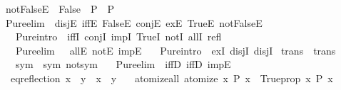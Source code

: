 \begin{isabellebody}
%
\endisatagproof
{\isafoldproof}%
%
\isadelimproof
%
\endisadelimproof
\isanewline
{}\isamarkupfalse%
\ notFalseE{\isacharcolon}{\kern0pt}\ {\isachardoublequoteopen}{\isasymnot}\ False\ {\isasymLongrightarrow}\ P\ {\isasymLongrightarrow}\ P{\isachardoublequoteclose}%
\isadelimproof
\ %
\endisadelimproof
%
\isatagproof
\isacommand{{\isachardot}{\kern0pt}}\isamarkupfalse%
%
\endisatagproof
{\isafoldproof}%
%
\isadelimproof
%
\endisadelimproof
\isanewline
\isanewline
{}\isamarkupfalse%
\ {\isacharbrackleft}{\kern0pt}Pure{\isachardot}{\kern0pt}elim{\isacharbang}{\kern0pt}{\isacharbrackright}{\kern0pt}\ {\isacharequal}{\kern0pt}\ disjE\ iffE\ FalseE\ conjE\ exE\ TrueE\ notFalseE\isanewline
\ \ \ {\isacharbrackleft}{\kern0pt}Pure{\isachardot}{\kern0pt}intro{\isacharbang}{\kern0pt}{\isacharbrackright}{\kern0pt}\ {\isacharequal}{\kern0pt}\ iffI\ conjI\ impI\ TrueI\ notI\ allI\ refl\isanewline
\ \ \ {\isacharbrackleft}{\kern0pt}Pure{\isachardot}{\kern0pt}elim\ {}{\isacharbrackright}{\kern0pt}\ {\isacharequal}{\kern0pt}\ allE\ notE{\isacharprime}{\kern0pt}\ impE{\isacharprime}{\kern0pt}\isanewline
\ \ \ {\isacharbrackleft}{\kern0pt}Pure{\isachardot}{\kern0pt}intro{\isacharbrackright}{\kern0pt}\ {\isacharequal}{\kern0pt}\ exI\ disjI{}\ disjI{}\isanewline
\isanewline
{}\isamarkupfalse%
\ {\isacharbrackleft}{\kern0pt}trans{\isacharbrackright}{\kern0pt}\ {\isacharequal}{\kern0pt}\ trans\isanewline
\ \ \ {\isacharbrackleft}{\kern0pt}sym{\isacharbrackright}{\kern0pt}\ {\isacharequal}{\kern0pt}\ sym\ not{\isacharunderscore}{\kern0pt}sym\isanewline
\ \ \ {\isacharbrackleft}{\kern0pt}Pure{\isachardot}{\kern0pt}elim{\isacharquery}{\kern0pt}{\isacharbrackright}{\kern0pt}\ {\isacharequal}{\kern0pt}\ iffD{}\ iffD{}\ impE%
\isadelimdocument
%
\endisadelimdocument
%
\isatagdocument
%
\isamarkuptrue%
%
\endisatagdocument
{\isafolddocument}%
%
\isadelimdocument
%
\endisadelimdocument
{}\isamarkupfalse%
\ \isanewline
\ \ eq{\isacharunderscore}{\kern0pt}reflection{\isacharcolon}{\kern0pt}\ {\isachardoublequoteopen}x\ {\isacharequal}{\kern0pt}\ y\ {\isasymLongrightarrow}\ x\ {\isasymequiv}\ y{\isachardoublequoteclose}\ \ %
\isanewline
\isanewline
{}\isamarkupfalse%
\ atomize{\isacharunderscore}{\kern0pt}all\ {\isacharbrackleft}{\kern0pt}atomize{\isacharbrackright}{\kern0pt}{\isacharcolon}{\kern0pt}\ {\isachardoublequoteopen}{\isacharparenleft}{\kern0pt}{\isasymAnd}x{\isachardot}{\kern0pt}\ P\ x{\isacharparenright}{\kern0pt}\ {\isasymequiv}\ Trueprop\ {\isacharparenleft}{\kern0pt}{\isasymforall}x{\isachardot}{\kern0pt}\ P\ x{\isacharparenright}{\kern0pt}{\isachardoublequoteclose}\isanewline

\end{isabellebody}
